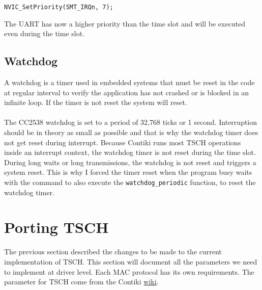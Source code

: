 \begin{lstlisting}
NVIC_SetPriority(SMT_IRQn, 7);
\end{lstlisting}

The UART has now a higher priority than the time slot and will be executed even
during the time slot.

\subsection{Watchdog}

A watchdog is a timer used in embedded systems that must be reset in the
code at regular interval to verify the application has not crashed or is blocked
in an infinite loop. If the timer is not reset the system will reset.

\paragraph{}

The CC2538 watchdog is set to a period of 32,768 ticks or 1 second.
Interruption should be in theory as small as possible and that is why the watchdog timer
does not get reset during interrupt.
Because Contiki runs most TSCH operations inside an interrupt
context, the watchdog timer is not reset during the time slot.
During long waits or long transmissions, the watchdog is not reset and triggers
a system reset.
This is why I forced the timer reset when the program busy waits with the command
to also execute the \lstinline{watchdog_periodic} function, to reset the
watchdog timer.

%
%

\section{Porting TSCH}

The previous section described the changes to be made to the current
implementation of TSCH.
This section will document all the parameters we need to implement at driver
level.
Each MAC protocol has its own requirements. The parameter for TSCH come from
the Contiki \href{https://github.com/contiki-ng/contiki-ng/wiki/Documentation:-TSCH-and-6TiSCH}{wiki}.

